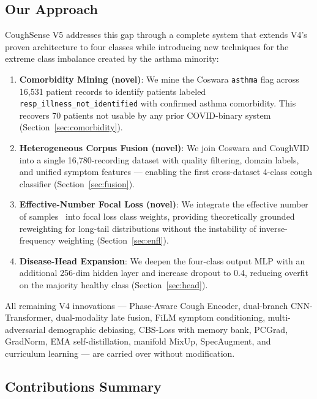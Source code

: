 \documentclass[journal]{IEEEtran}
\begin{document}
\subsection{Our Approach}

CoughSense V5 addresses this gap through a complete system that
extends V4's proven architecture to four classes while introducing
new techniques for the extreme class imbalance created by the asthma
minority:

\begin{enumerate}
\item \textbf{Comorbidity Mining (novel)}: We mine the Coswara
\texttt{asthma} flag across 16,531 patient records to identify
patients labeled \texttt{resp\_illness\_not\_identified} with confirmed
asthma comorbidity. This recovers 70 patients not usable by any prior
COVID-binary system (Section~\ref{sec:comorbidity}).

\item \textbf{Heterogeneous Corpus Fusion (novel)}: We join Coswara
and CoughVID into a single 16,780-recording dataset with quality
filtering, domain labels, and unified symptom features — enabling
the first cross-dataset 4-class cough classifier
(Section~\ref{sec:fusion}).

\item \textbf{Effective-Number Focal Loss (novel)}: We integrate the
effective number of samples~\cite{effectivenum} into focal loss
class weights, providing theoretically grounded reweighting for
long-tail distributions without the instability of inverse-frequency
weighting (Section~\ref{sec:enfl}).

\item \textbf{Disease-Head Expansion}: We deepen the four-class
output MLP with an additional 256-dim hidden layer and increase
dropout to 0.4, reducing overfit on the majority healthy class
(Section~\ref{sec:head}).
\end{enumerate}

All remaining V4 innovations — Phase-Aware Cough Encoder, dual-branch
CNN-Transformer, dual-modality late fusion, FiLM symptom conditioning,
multi-adversarial demographic debiasing, CBS-Loss with memory bank,
PCGrad, GradNorm, EMA self-distillation, manifold MixUp, SpecAugment,
and curriculum learning — are carried over without modification.

\subsection{Contributions Summary}
\end{document}
